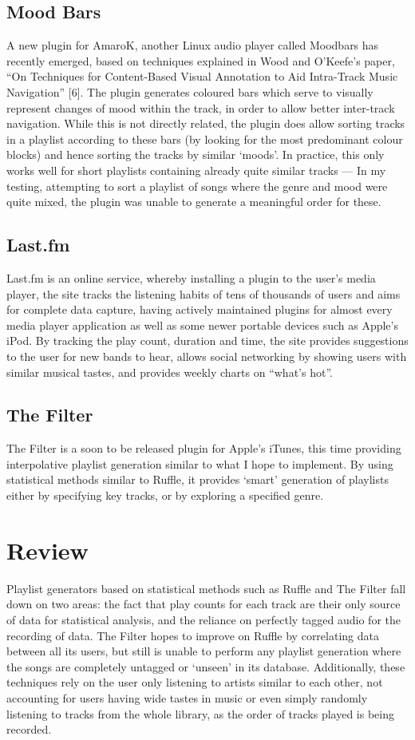 \subsection{Mood Bars}
A new plugin for AmaroK, another Linux audio player called Moodbars has recently emerged, based on techniques explained in Wood and O'Keefe's paper, ``On Techniques for Content-Based Visual Annotation to Aid Intra-Track Music Navigation'' [6]. The plugin generates coloured bars which serve to visually represent changes of mood within the track, in order to allow better inter-track navigation. While this is not directly related, the plugin does allow sorting tracks in a playlist according to these bars (by looking for the most predominant colour blocks) and hence sorting the tracks by similar ‘moods’. In practice, this only works well for short playlists containing already quite similar tracks --- In my testing, attempting to sort a playlist of songs where the genre and mood were quite mixed, the plugin was unable to generate a meaningful order for these.
\subsection{Last.fm}
Last.fm is an online service, whereby installing a plugin to the user's media player, the site tracks the listening habits of tens of thousands of users and aims for complete data capture, having actively maintained plugins for almost every media player application as well as some newer portable devices such as Apple's iPod. By tracking the play count, duration and time, the site provides suggestions to the user for new bands to hear, allows social networking by showing users with similar musical tastes, and provides weekly charts on ``what's hot''.
\subsection{The Filter}
The Filter is a soon to be released plugin for Apple's iTunes, this time providing interpolative playlist generation similar to what I hope to implement. By using statistical methods similar to Ruffle, it provides `smart' generation of playlists either by specifying key tracks, or by exploring a specified genre.
\section{Review}
Playlist generators based on statistical methods such as Ruffle and The Filter fall down on two areas: the fact that play counts for each track are their only source of data for statistical analysis, and the reliance on perfectly tagged audio for the recording of data. The Filter hopes to improve on Ruffle by correlating data between all its users, but still is unable to perform any playlist generation where the songs are completely untagged or `unseen' in its database. Additionally, these techniques rely on the user only listening to artists similar to each other, not accounting for users having wide tastes in music or even simply randomly listening to tracks from the whole library, as the order of tracks played is being recorded.

